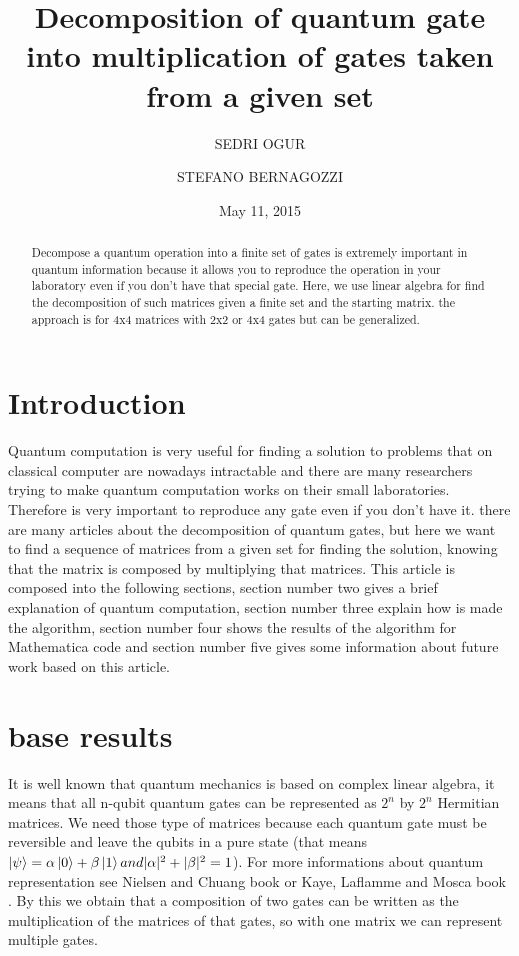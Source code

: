 \documentclass{amsart}
\begin{document}
\title[Decomposition of quantum gate]{Decomposition of quantum gate into multiplication of gates taken from a given set}
\author{SEDRI OGUR}


\author{STEFANO BERNAGOZZI}

\date{May 11, 2015}
\subjclass{} %
\keywords{}%
\dedicatory{}
\break
\begin{abstract}


Decompose a quantum operation into a finite set of gates is extremely important in quantum information because it allows you to reproduce the operation in your laboratory even if you don't have that special gate. Here, we use linear algebra for find the decomposition of such matrices given a finite set and the starting matrix. the approach is for 4x4 matrices with 2x2 or 4x4 gates but can be generalized.

\end{abstract}
\maketitle


\section{Introduction}

Quantum computation is very useful for finding a solution to problems that on classical computer are nowadays intractable and there are many researchers trying to make quantum computation works on their small laboratories. Therefore is very important to reproduce any gate even if you don't have it. there are many articles about the decomposition of quantum gates, but here we want to find a sequence of matrices from a given set for finding the solution, knowing that the matrix is composed by multiplying that matrices. This article is composed into the following sections, section number two gives a brief explanation of quantum computation, section number three explain how is made the algorithm, section number four shows the results of the algorithm for Mathematica code and section number five gives some information about future work based on this article.
\\
\section{base results}

It is well known that quantum mechanics is based on complex linear algebra, it means that all n-qubit quantum gates can be represented as $2^n$ by $2^n$ Hermitian matrices. We need those type of matrices because each quantum gate must be reversible and leave the qubits in a pure state (that means $\ket{\psi} = \alpha \ket{0} + \beta \ket{1} and |\alpha|^2 + |\beta|^2 = 1$). For more informations about quantum representation see Nielsen and Chuang book\cite{nielsen} or Kaye, Laflamme and Mosca book \cite{oxford}. 
By this we obtain that a composition of two gates can be written as the multiplication of the matrices of that gates, so with one matrix we can represent multiple gates.\\ 
\end{document}
